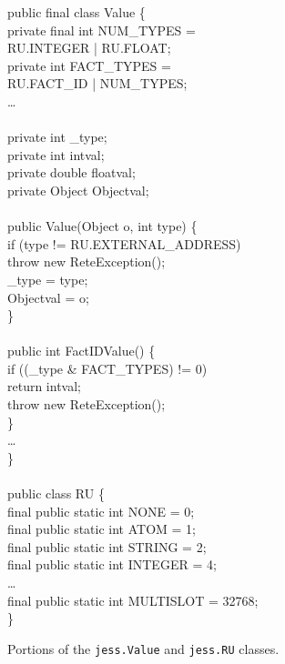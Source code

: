 \documentclass[preprint]{acmconf}
\begin{document}
\begin{figure}
\begin{samplecode}
public final class Value \{\\
\>private final int NUM\_TYPES =\\
\>\>\>\>RU.INTEGER | RU.FLOAT;\\
\>private int FACT\_TYPES =\\
\>\>\>\>RU.FACT\_ID | NUM\_TYPES;\\
\>\ldots\\
\\
\>private int            \_type;\\
\>private int            intval;\\
\>private double       floatval;\\
\>private Object      Objectval;\\
\\
\>public Value(Object o, int type) \{\\
\>\>if (type != RU.EXTERNAL\_ADDRESS)\\
\>\>\>throw new ReteException();\\
\>\>\_type = type;\\
\>\>Objectval = o;\\
\>\}\\
\\
\>public int FactIDValue() \{\\
\>\>if ((\_type {\&} FACT\_TYPES) != 0)\\
\>\>\>return intval;\\
\>\>throw new ReteException();\\
\>\}\\
\>\ldots\\
\}\\
\\
public class RU \{\\
\>final public static int NONE             =     0;\\
\>final public static int ATOM             =     1;\\
\>final public static int STRING           =     2;\\
\>final public static int INTEGER          =     4;\\
\>\ldots\\
\>final public static int MULTISLOT        = 32768;\\
\}\\
\end{samplecode}
\caption{Portions of the {\tt jess.Value} and {\tt jess.RU} classes.}
\label{fig:jess-classes}
\end{figure}
\end{document}
